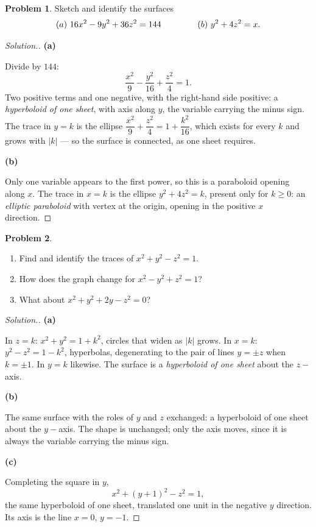 \documentclass[11pt,a4paper]{article}
\theoremstyle{definition}
\newtheorem{problemx}{Problem}[subsection]
\newenvironment{problem}{\begin{problemx}}{\end{problemx}}
\newenvironment{solution}
  {\renewcommand{\qedsymbol}{}\begin{proof}[\textit{Solution}.]}
  {\end{proof}}
\newcommand{\subhead}[1]{%
  \par\medskip\noindent\textbf{#1}\par\nobreak\smallskip}
\begin{document}
\begin{problem}
Sketch and identify the surfaces
$$(a)\ 16x^2-9y^2+36z^2 = 144\hspace{1.5cm}(b)\ y^2+4z^2 = x .$$
\end{problem}
\begin{solution}
\subhead{(a)}
Divide by $144$:
$$\frac{x^2}{9} - \frac{y^2}{16} + \frac{z^2}{4} = 1 .$$
Two positive terms and one negative, with the right-hand side positive: a
\emph{hyperboloid of one sheet}, with axis along $y$, the variable carrying the
minus sign. The trace in $y=k$ is the ellipse
$\dfrac{x^2}{9}+\dfrac{z^2}{4} = 1+\dfrac{k^2}{16}$, which exists for every $k$
and grows with $\left|k\right|$ --- so the surface is connected, as one sheet
requires.

\subhead{(b)}
Only one variable appears to the first power, so this is a paraboloid opening
along $x$. The trace in $x=k$ is the ellipse $y^2+4z^2 = k$, present only for
$k\geq 0$: an \emph{elliptic paraboloid} with vertex at the origin, opening in
the positive $x$ direction.
\end{solution}

\begin{problem}
\begin{enumerate}
\item[(a)] Find and identify the traces of $x^2+y^2-z^2 = 1$.
\item[(b)] How does the graph change for $x^2-y^2+z^2 = 1$?
\item[(c)] What about $x^2+y^2+2y-z^2 = 0$?
\end{enumerate}
\end{problem}
\begin{solution}
\subhead{(a)}
In $z=k$: $x^2+y^2 = 1+k^2$, circles that widen as $\left|k\right|$ grows.
In $x=k$: $y^2-z^2 = 1-k^2$, hyperbolas, degenerating to the pair of lines
$y=\pm z$ when $k=\pm 1$. In $y=k$ likewise. The surface is a
\emph{hyperboloid of one sheet} about the $z-$axis.

\subhead{(b)}
The same surface with the roles of $y$ and $z$ exchanged: a hyperboloid of one
sheet about the $y-$axis. The shape is unchanged; only the axis moves, since it
is always the variable carrying the minus sign.

\subhead{(c)}
Completing the square in $y$,
$$x^2+(y+1)^2-z^2 = 1 ,$$
the same hyperboloid of one sheet, translated one unit in the negative $y$
direction. Its axis is the line $x=0$, $y=-1$.
\end{solution}
\end{document}
